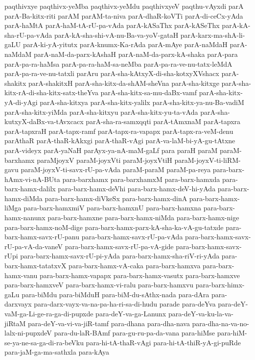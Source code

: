 {paqthivxye
paqthivx-yeMba
paqthivx-yeMdu
paqthivxyeV
paqthu-vAyxdi
parA
parA-Ba-kitx-riti
parAM
parAM-ta-niva
parA-dhaR-koVTi
parA-di-ceCx-yAda
parA-haMtA
parA-haM-tA-rU-pa-vAda
parA-kASaThx
parA-kASeThx
parA-kA-sha-rU-pa-vAda
parA-kA-sha-shi-vA-nu-Ba-va-yoV-gataH
parA-karx-ma-shA-li-gaLU
parA-ki-yA-yitutx
parA-knumx-Ka-rAda
parA-mAye
parA-naMdaH
parA-naMdaM
parA-naM-da-parx-kAshaH
parA-naM-da-parx-kA-shaka
parA-para
parA-pa-ra-haMsa
parA-pa-ra-haM-sa-neMba
parA-pa-ra-ve-nu-tatx-leMdA
parA-pa-ra-ve-nu-tatxli
parAru
parA-sha-kAtxyX-di-sha-kotxyXVshacx
parA-shakitx
parA-shakitxH
parA-sha-kitx-da-shAM-sheVna
parA-sha-kitxge
parA-sha-kitx-rA-di-sha-kitx-satx-theYva
parA-sha-kitx-sa-mu-daBx-vamf
parA-sha-kitx-yA-di-yAgi
parA-sha-kitxya
parA-sha-kitx-yalilx
parA-sha-kitx-ya-nu-Ba-vadiM
parA-sha-kitx-yiMda
parA-sha-kitxyu
parA-sha-kitx-yu-ta-vAda
parA-sha-kutxyX-daBx-va-tAvxcacx
parA-sha-ra-samxqqti
parA-tAmxnaM
parA-tapxra
parA-tapxraH
parA-tapx-ramf
parA-tapx-ra-vapapx
parA-tapx-ra-veM-denu
parAthaR
parA-thaR-kAkxgi
parA-thaR-vAgi
parA-va-laM-bi-yA-gu-tAtxne
parA-videyx
parA-yaNaH
parAyx-ya-nA-maM-gaLf
para
paraH
paraM
paraM-barxhamx
paraMjoyxV
paraM-joyxVti
paraM-joyxVtiH
paraM-joyxV-ti-liRM-gavu
paraM-joyxV-ti-savx-rU-pa-vAda
paraM-paraM
paraM-pa-reya
para-barx-hAmx-vi-nA-BUta
para-barxhamx
para-barxhamxM
para-barx-hamxda
para-barx-hamx-dalilx
para-barx-hamx-deVhi
para-barx-hamx-deV-hi-yAda
para-barx-hamx-diMda
para-barx-hamx-diVkeSx
para-barx-hamx-dinA
para-barx-hamx-liMga
para-barx-hamxmiV
para-barx-hamxnU
para-barx-hamxna
para-barx-hamx-nanunx
para-barx-hamxne
para-barx-hamx-niMda
para-barx-hamx-nige
para-barx-hamx-noM-dige
para-barx-hamx-parx-kA-sha-ka-vA-gu-tatxde
para-barx-hamx-savx-rU-panu
para-barx-hamx-savx-rU-pa-vAda
para-barx-hamx-savx-rU-pa-vA-da-vaneV
para-barx-hamx-savx-rU-pa-vA-gide
para-barx-hamx-savx-rUpi
para-barx-hamx-savx-rU-pi-yAda
para-barx-hamx-sha-riV-ri-yAda
para-barx-hamx-tatatxvX
para-barx-hamx-vA-caka
para-barx-hamxva
para-barx-hamx-vanu
para-barx-hamx-vapapx
para-barx-hamx-vasutx
para-barx-hamxve
para-barx-hamxveV
para-barx-hamx-vi-ralu
para-barx-hamxvu
para-barx-himx-gaLu
para-biMdu
para-biMduH
para-biM-du-sAthx-nada
para-dAra
para-darxvayx
para-darx-vayx-va-na-pa-ha-ri-sa-di-hudu
parade
para-deYva
para-deY-vaM-ga-Li-ge-ra-ga-di-pupxde
para-deY-va-ga-Lanunx
para-deY-va-ku-la-va-jiRtaM
para-deY-va-vi-va-jiR-tamf
para-dhana
para-dha-nava
para-dha-na-va-no-lalx-ni-pupxdeV
para-du-laR-BAmf
para-gu-ru-pa-da-vana
para-hiMse
para-hiM-se-ya-ne-sa-ga-di-ra-beVku
para-hi-tA-thaR-vAgi
para-hi-tA-thiR-yA-gi-puRde
para-jaM-ga-ma-sathxla
para-kAya
}
